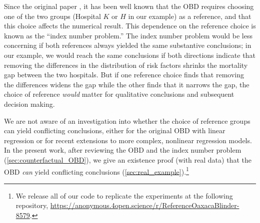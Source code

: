 

Since the original paper \citep{oaxaca1973}, it has been well known that the OBD requires choosing one of the two groups (Hospital $K$ or $H$ in our example) as a reference, and that this choice affects the numerical result.
This dependence on the reference choice is known as the ``index number problem.''
The index number problem would be less concerning if both references always yielded the same substantive conclusions;
in our example, we would reach the same conclusions if both directions indicate that removing the differences in the distribution of risk factors shrinks the mortality gap between the two hospitals.
But if one reference choice finds that removing the differences widens the gap while the other finds that it narrows the gap, the choice of reference \emph{would} matter for qualitative conclusions and subsequent decision making.

We are not aware of an investigation into whether the choice of reference groups can yield conflicting conclusions, either
for the original OBD with linear regression or for recent extensions to more complex, nonlinear regression models.
In the present work, after reviewing the OBD and the index number problem (\cref{sec:counterfactual_OBD}), we 
give an existence proof (with real data) that the OBD \emph{can} yield conflicting conclusions (\cref{sec:real_example}).\footnote{We release all of our code to replicate the experiments at the following repository, \url{https://anonymous.4open.science/r/ReferenceOaxacaBlinder-8579}.} %

